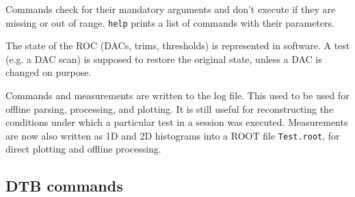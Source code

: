 \documentclass[english]{article}
\begin{document}
Commands check for their mandatory arguments and don't execute if
they are missing or out of range. \texttt{help} prints a list of commands
with their parameters.

The state of the ROC (DACs, trims, thresholds) is represented in software.
A test (e.g. a DAC scan) is supposed to restore the original state,
unless a DAC is changed on purpose.

Commands and measurements are written to the log file. This used to
be used for offline parsing, processing, and plotting. It is still
useful for reconstructing the conditions under which a particular
test in a session was executed. Measurements are now also written
as 1D and 2D histograms into a ROOT file \texttt{Test.root}, for direct
plotting and offline processing.


\subsection{DTB commands}
\end{document}
